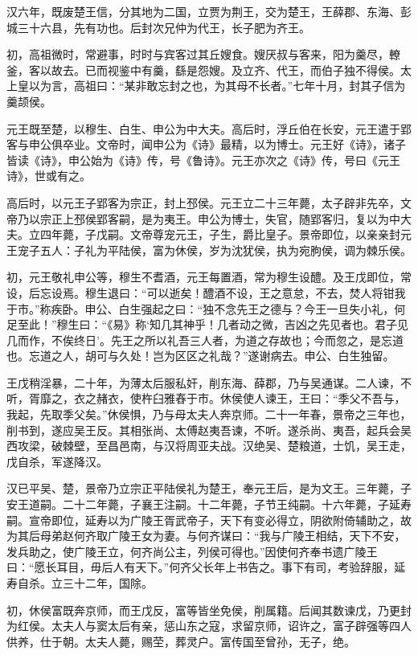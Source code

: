 \documentclass[]{article}
\begin{document}
汉六年，既废楚王信，分其地为二国，立贾为荆王，交为楚王，王薛郡、东海、彭城三十六县，先有功也。后封次兄仲为代王，长子肥为齐王。

初，高祖微时，常避事，时时与宾客过其丘嫂食。嫂厌叔与客来，阳为羹尽，轑釜，客以故去。已而视鉴中有羹，繇是怨嫂。及立齐、代王，而伯子独不得侯。太上皇以为言，高祖曰：``某非敢忘封之也，为其母不长者。''七年十月，封其子信为羹颉侯。

元王既至楚，以穆生、白生、申公为中大夫。高后时，浮丘伯在长安，元王遣于郢客与申公俱卒业。文帝时，闻申公为《诗》最精，以为博士。元王好《诗》，诸子皆读《诗》，申公始为《诗》传，号《鲁诗》。元王亦次之《诗》传，号曰《元王诗》，世或有之。

高后时，以元王子郢客为宗正，封上邳侯。元王立二十三年薨，太子辟非先卒，文帝乃以宗正上邳侯郢客嗣，是为夷王。申公为博士，失官，随郢客归，复以为中大夫。立四年薨，子戊嗣。文帝尊宠元王，子生，爵比皇子。景帝即位，以亲亲封元王宠子五人：子礼为平陆侯，富为休侯，岁为沈犹侯，执为宛朐侯，调为棘乐侯。

初，元王敬礼申公等，穆生不耆酒，元王每置酒，常为穆生设醴。及王戊即位，常设，后忘设焉。穆生退曰：``可以逝矣！醴酒不设，王之意怠，不去，焚人将钳我于市。''称疾卧。申公、白生强起之曰：``独不念先王之德与？今王一旦失小礼，何足至此！''穆生曰：``《易》称`知几其神乎！几者动之微，吉凶之先见者也。君子见几而作，不俟终日'。先王之所以礼吾三人者，为道之存故也；今而忽之，是忘道也。忘道之人，胡可与久处！岂为区区之礼哉？''遂谢病去。申公、白生独留。

王戊稍淫暴，二十年，为薄太后服私奸，削东海、薛郡，乃与吴通谋。二人谏，不听，胥靡之，衣之赭衣，使杵臼雅舂于市。休侯使人谏王，王曰：``季父不吾与，我起，先取季父矣。''休侯惧，乃与母太夫人奔京师。二十一年春，景帝之三年也，削书到，遂应吴王反。其相张尚、太傅赵夷吾谏，不听。遂杀尚、夷吾，起兵会吴西攻梁，破棘壁，至昌邑南，与汉将周亚夫战。汉绝吴、楚粮道，士饥，吴王走，戊自杀，军遂降汉。

汉已平吴、楚，景帝乃立宗正平陆侯礼为楚王，奉元王后，是为文王。三年薨，子安王道嗣。二十二年薨，子襄王注嗣。十二年薨，子节王纯嗣。十六年薨，子延寿嗣。宣帝即位，延寿以为广陵王胥武帝子，天下有变必得立，阴欲附倚辅助之，故为其后母弟赵何齐取广陵王女为妻。与何齐谋曰：``我与广陵王相结，天下不安，发兵助之，使广陵王立，何齐尚公主，列侯可得也。''因使何齐奉书遗广陵王曰：``愿长耳目，毋后人有天下。''何齐父长年上书告之。事下有司，考验辞服，延寿自杀。立三十二年，国除。

初，休侯富既奔京师，而王戊反，富等皆坐免侯，削属籍。后闻其数谏戊，乃更封为红侯。太夫人与窦太后有亲，惩山东之寇，求留京师，诏许之，富子辟强等四人供养，仕于朝。太夫人薨，赐茔，葬灵户。富传国至曾孙，无子，绝。
\end{document}

